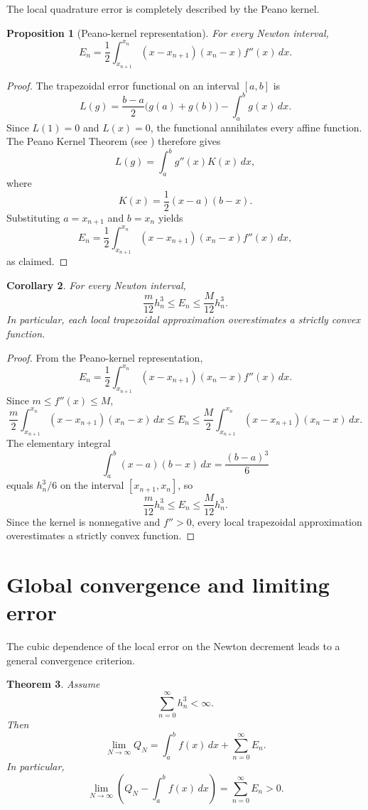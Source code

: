 \documentclass[psamsfonts,reqno]{amsart}
\theoremstyle{plain}
\newtheorem{theorem}{Theorem}[section]
\newtheorem{proposition}[theorem]{Proposition}
\newtheorem{corollary}[theorem]{Corollary}
\theoremstyle{definition}
\theoremstyle{remark}
\numberwithin{equation}{section}
\begin{document}
The local quadrature error is completely described by the Peano kernel.

\begin{proposition}[Peano-kernel representation]
For every Newton interval,
\[
E_n
=
\frac12
\int_{x_{n+1}}^{x_n}
(x-x_{n+1})(x_n-x)f''(x)\,dx.
\]
\end{proposition}

\begin{proof}
The trapezoidal error functional on an interval $[a,b]$ is
\[
L(g)=\frac{b-a}{2}\bigl(g(a)+g(b)\bigr)-\int_a^bg(x)\,dx.
\]
Since $L(1)=0$ and $L(x)=0$, the functional annihilates every affine
function. The Peano Kernel Theorem (see \cite{DavisRabinowitz}) therefore gives
\[
L(g)=\int_a^bg''(x)K(x)\,dx,
\]
where
\[
K(x)=\frac12(x-a)(b-x).
\]
Substituting $a=x_{n+1}$ and $b=x_n$ yields
\[
E_n
=\frac12\int_{x_{n+1}}^{x_n}
(x-x_{n+1})(x_n-x)f''(x)\,dx,
\]
as claimed.
\end{proof}
\begin{corollary}\label{cor: 3.3}
For every Newton interval,
\[
\frac{m}{12}h_n^3
\le
E_n
\le
\frac{M}{12}h_n^3.
\]
In particular, each local trapezoidal approximation overestimates a strictly
convex function.
\end{corollary}

\begin{proof}
From the Peano-kernel representation,
\[
E_n
=\frac12
\int_{x_{n+1}}^{x_n}
(x-x_{n+1})(x_n-x)f''(x)\,dx.
\]
Since $m\le f''(x)\le M$,
\[
\frac m2\int_{x_{n+1}}^{x_n}
(x-x_{n+1})(x_n-x)\,dx
\le E_n\le
\frac M2\int_{x_{n+1}}^{x_n}
(x-x_{n+1})(x_n-x)\,dx.
\]
The elementary integral
\[
\int_a^b(x-a)(b-x)\,dx=\frac{(b-a)^3}{6}
\]
equals $h_n^3/6$ on the interval $[x_{n+1},x_n]$, so
\[
\frac{m}{12}h_n^3
\le E_n
\le\frac{M}{12}h_n^3.
\]
Since the kernel is nonnegative and $f''>0$, every local trapezoidal
approximation overestimates a strictly convex function.
\end{proof}


\section{Global convergence and limiting error}

The cubic dependence of the local error on the Newton decrement leads to a
general convergence criterion.

\begin{theorem}\label{thm: 4.1}
Assume
\[
\sum_{n=0}^{\infty} h_n^3 < \infty.
\]
Then
\[
\lim_{N\to\infty} Q_N
=
\int_a^b f(x)\,dx
+
\sum_{n=0}^{\infty}E_n.
\]
In particular,
\[
\lim_{N\to\infty}
\left(
Q_N-\int_a^b f(x)\,dx
\right)
=
\sum_{n=0}^{\infty}E_n
>0.
\]
\end{theorem}
\end{document}
